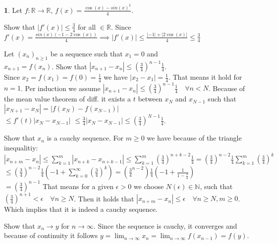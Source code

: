 \documentclass[a4paper, 10pt]{article}
\theoremstyle{definition}
\theoremstyle{ex}
\newtheorem*{exercise}{}
\theoremstyle{named}
\newcommand{\R}{\mathbb{R}}
\newcommand{\N}{\mathbb{N}}
\begin{document}
\begin{exercise}
    Let $f: \R \to \R$, $f(x) = \frac{\cos(x) - sin(x)^2}{4}$.
    \begin{exanswers}
        \item Show that $|f'(x)| \leq \frac{3}{4}$ for all $ \in \R$. Since $f'(x) = \frac{sin(x)(-1 - 2 \cos(x))}{4} \implies |f'(x)| \leq \frac{|-1| + |2\cos(x)|}{4} \leq \frac{3}{4}$
        \item Let $(x_n)_{n \geq 1}$ be a sequence such that $x_1 = 0$ and \\
        $x_{n+1} = f(x_n)$. Show that $|x_{n+1} - x_n| \leq (\frac{3}{4})^{n - 1} \frac{1}{4}$. \\
        Since $x_2 = f(x_1) = f(0) = \frac{1}{4}$ we have $|x_2 - x_1| = \frac{1}{4}$. That means it hold for $n = 1$. Per induction we assume $|x_{n+1} - x_n| \leq (\frac{3}{4})^{n-1} \frac{1}{4} \quad \forall n < N$. Because of the mean value theorem of diff. it exists a $t$ between $x_N$ and $x_{N - 1}$ such that $|x_{N + 1} - x_N| = |f(x_N) - f(x_{N - 1})| $ \\
        $\leq f'(t)|x_N - x_{N - 1}|$ $\leq \frac{3}{4}|x_N - x_{N - 1}| \leq (\frac{3}{4})^{N - 1} \frac{1}{4}$.
        \framebreak
        \item Show that $x_n$ is a cauchy sequence. For $m \geq 0$ we have because of the triangle inequalitiy: $|x_{n + m} - x_n| \leq \sum\limits_{k=1}^m |x_{n + k} - x_{n + k - 1}| \leq \sum\limits_{k=1}^m (\frac{3}{4})^{n + k - 2} \frac{1}{4} = (\frac{3}{4})^{n - 2} \frac{1}{4} \sum\limits_{k=1}^m (\frac{3}{4})^k$ \\
        $\leq (\frac{3}{4})^{n - 2} \frac{1}{4} (-1 + \sum\limits_{k = 0}^\infty (\frac{3}{4})^k) = (\frac{3}{4}^{n - 2}) \frac{1}{4} (-1 + \frac{1}{1 - \frac{3}{4}})$ \\
        $= (\frac{3}{4})^{n - 1}$ That means for a given $\epsilon > 0$ we choose $N(\epsilon) \in \N$, such that $(\frac{3}{4})^{n + 1} < \epsilon \quad \forall n \geq N$. Then it holds that $|x_{n + m} - x_n| \leq \epsilon \quad \forall n \geq N, m \geq 0$. Which implies that it is indeed a cauchy sequence.
        \item Show that $x_n \to y$ for $n \to \infty$. Since the sequence is cauchy, it converges and because of continuity it follows $y = \lim_{n \to \infty} x_n = \lim_{n\to\infty} f(x_{n-1}) = f(y)$.
    \end{exanswers}
\end{exercise}
\end{document}
